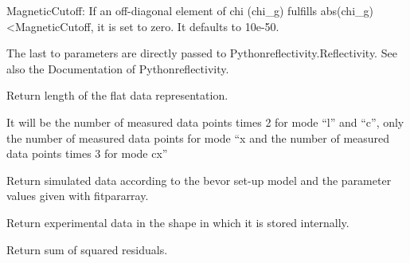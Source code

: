 \documentclass[letterpaper,10pt,english]{sphinxmanual}
\begin{document}
\begin{fulllineitems}
\begin{fulllineitems}
MagneticCutoff: If an off-diagonal element of chi (chi\_g) fulfills abs(chi\_g)\textless{}MagneticCutoff, it is set to zero. It defaults to 10e-50.

The last to parameters are directly passed to Pythonreflectivity.Reflectivity. See also the Documentation of Pythonreflectivity.

\end{fulllineitems}


\begin{fulllineitems}
\label{\detokenize{modules-api/experiment:Experiment.ReflDataSimulator.getLenDataFlat}}
Return length of the flat data representation.

It will be the number of measured data points times 2 for mode “l” and “c”, only the number of measured data points for mode “x and the number of measured data points times 3 for mode cx”

\end{fulllineitems}


\begin{fulllineitems}
\label{\detokenize{modules-api/experiment:Experiment.ReflDataSimulator.getSimData}}
Return simulated data according to the bevor set-up model and the parameter values given with fitpararray.

\end{fulllineitems}


\begin{fulllineitems}
\label{\detokenize{modules-api/experiment:Experiment.ReflDataSimulator.getExpData}}
Return experimental data in the shape in which it is stored internally.

\end{fulllineitems}


\begin{fulllineitems}
\label{\detokenize{modules-api/experiment:Experiment.ReflDataSimulator.getSSR}}
Return sum of squared residuals.


\end{fulllineitems}
\end{fulllineitems}
\end{document}
